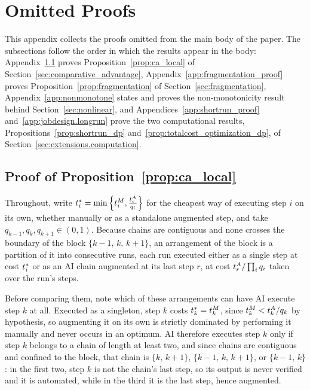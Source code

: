 \section{Omitted Proofs}
\label{app:omitted_proofs}

This appendix collects the proofs omitted from the main body of the paper.
The subsections follow the order in which the results appear in the body: Appendix~\ref{app:ca_local_proof} proves Proposition~\ref{prop:ca_local} of Section~\ref{sec:comparative_advantage}, Appendix~\ref{app:fragmentation_proof} proves Proposition~\ref{prop:fragmentation} of Section~\ref{sec:fragmentation}, Appendix~\ref{app:nonmonotone} states and proves the non-monotonicity result behind Section~\ref{sec:nonlinear}, and Appendices~\ref{app:shortrun_proof} and~\ref{app:jobdesign.longrun} prove the two computational results, Propositions~\ref{prop:shortrun_dp} and~\ref{prop:totalcost_optimization_dp}, of Section~\ref{sec:extensions.computation}.

\subsection{Proof of Proposition~\ref{prop:ca_local}}
\label{app:ca_local_proof}

Throughout, write $t^*_{i} = \min\left\{t^{M}_{i}, \frac{t^{A}_{i}}{q_i}\right\}$ for the cheapest way of executing step $i$ on its own, whether manually or as a standalone augmented step, and take $q_{k-1}, q_k, q_{k+1} \in (0,1)$.
Because chains are contiguous and none crosses the boundary of the block $\{k-1,\, k,\, k+1\}$, an arrangement of the block is a partition of it into consecutive runs, each run executed either as a single step at cost $t^*_{i}$ or as an AI chain augmented at its last step $r$, at cost $t^{A}_{r}/\prod_i q_i$ taken over the run's steps.

Before comparing them, note which of these arrangements can have AI execute step $k$ at all.
Executed as a singleton, step $k$ costs $t^*_{k} = t^{M}_{k}$, since $t^{M}_{k} < t^{A}_{k}/q_k$ by hypothesis, so augmenting it on its own is strictly dominated by performing it manually and never occurs in an optimum.
AI therefore executes step $k$ only if step $k$ belongs to a chain of length at least two, and since chains are contiguous and confined to the block, that chain is $\{k,\, k+1\}$, $\{k-1,\, k,\, k+1\}$, or $\{k-1,\, k\}$: in the first two, step $k$ is not the chain's last step, so its output is never verified and it is automated, while in the third it is the last step, hence augmented.

